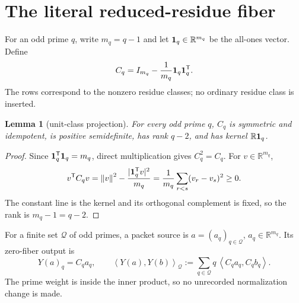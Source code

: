 \documentclass[11pt]{article}
\newtheorem{lemma}{Lemma}
\newcommand{\ip}[2]{\left\langle #1,#2\right\rangle}
\newcommand{\norm}[1]{\left\lVert #1\right\rVert}
\newcommand{\Qp}{\mathcal Q}
\begin{document}
\section{The literal reduced-residue fiber}
For an odd prime \(q\), write \(m_q=q-1\) and let
\({\bf 1}_q\in{\mathbb R}^{m_q}\) be the all-ones vector.  Define
\begin{equation}
C_q=I_{m_q}-\frac{1}{m_q}{\bf 1}_q{\bf 1}_q^{\mathsf T}.
\label{eq:C}
\end{equation}
The rows correspond to the nonzero residue classes; no ordinary residue
class is inserted.

\begin{lemma}[unit-class projection]
For every odd prime \(q\), \(C_q\) is symmetric and idempotent, is positive
semidefinite, has rank \(q-2\), and has kernel
\({\mathbb R}{\bf 1}_q\).
\end{lemma}
\begin{proof}
Since \({\bf 1}_q^{\mathsf T}{\bf 1}_q=m_q\), direct multiplication gives
\(C_q^2=C_q\).  For \(v\in{\mathbb R}^{m_q}\),
\begin{equation}
v^{\mathsf T}C_qv
=\norm{v}^2-\frac{|{\bf 1}_q^{\mathsf T}v|^2}{m_q}
=\frac{1}{m_q}\sum_{r<s}(v_r-v_s)^2\geq0.
\label{eq:psd}
\end{equation}
The constant line is the kernel and its orthogonal complement is fixed, so
the rank is \(m_q-1=q-2\).
\end{proof}

For a finite set \(\Qp\) of odd primes, a packet source is
\(a=(a_q)_{q\in\Qp}\), \(a_q\in{\mathbb R}^{m_q}\).  Its zero-fiber output is
\begin{equation}
Y(a)_q=C_qa_q,\qquad
\ip{Y(a)}{Y(b)}_{\Qp}
:=\sum_{q\in\Qp}q\,\ip{C_qa_q}{C_qb_q}.
\label{eq:weighted}
\end{equation}
The prime weight is inside the inner product, so no unrecorded normalization
change is made.
\end{document}
